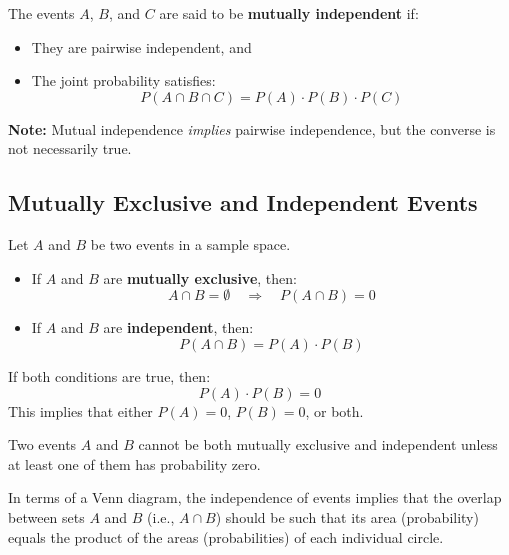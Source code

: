 \documentclass[twoside]{book}
\begin{document}
The events \( A \), \( B \), and \( C \) are said to be \textbf{mutually independent} if:
\begin{itemize}
    \item They are pairwise independent, and
    \item The joint probability satisfies:
    \[
    P(A \cap B \cap C) = P(A) \cdot P(B) \cdot P(C)
    \]
\end{itemize}

\textbf{Note:} Mutual independence \emph{implies} pairwise independence, but the converse is not necessarily true.

\subsection{Mutually Exclusive and Independent Events}

Let \( A \) and \( B \) be two events in a sample space.

\begin{itemize}
    \item If \( A \) and \( B \) are \textbf{mutually exclusive}, then:
    \[
    A \cap B = \emptyset \quad \Rightarrow \quad P(A \cap B) = 0
    \]

    \item If \( A \) and \( B \) are \textbf{independent}, then:
    \[
    P(A \cap B) = P(A) \cdot P(B)
    \]
\end{itemize}

If both conditions are true, then:
\[
P(A) \cdot P(B) = 0
\]
This implies that either \( P(A) = 0 \), \( P(B) = 0 \), or both.

\begin{textbox}
Two events \( A \) and \( B \) cannot be both mutually exclusive and independent unless at least one of them has probability zero.
\end{textbox}


In terms of a Venn diagram, the independence of events implies that the overlap between sets \( A \) and \( B \) (i.e., \( A \cap B \)) should be such that its area (probability) equals the product of the areas (probabilities) of each individual circle.

\begin{center}
\end{center}
\end{document}
